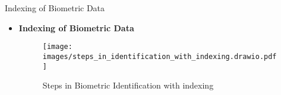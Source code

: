 \begin{frame}[t]{Indexing of Biometric Data}
	\topline
    \begin{itemize}
    	\item \textcolor{navy_theme}{\textbf{Indexing of Biometric Data}}
    	\vspace{0.5em}
			\begin{figure}[!ht]
				\centering 
				\texttt{[image: images/steps\_in\_identification\_with\_indexing.drawio.pdf]}
				\caption{Steps in Biometric Identification with indexing}
				\label{fig:bio_indexing}
			\end{figure}
	\end{itemize}
\end{frame}

